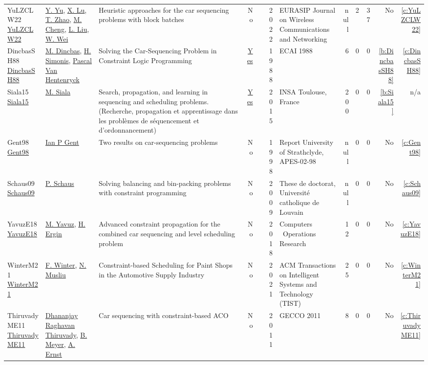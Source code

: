 {\begin{longtable}{>{\raggedright\arraybackslash}p{3cm}>{\raggedright\arraybackslash}p{6cm}>{\raggedright\arraybackslash}p{6.5cm}rrrp{2.5cm}rrrrr}
YuLZCLW22 \href{http://dx.doi.org/10.1186/s13638-022-02113-7}{YuLZCLW22} & \hyperref[auth:a55]{Y. Yu}, \hyperref[auth:a56]{X. Lu}, \hyperref[auth:a57]{T. Zhao}, \hyperref[auth:a58]{M. Cheng}, \hyperref[auth:a59]{L. Liu}, \hyperref[auth:a60]{W. Wei} & Heuristic approaches for the car sequencing problems with block batches & No & \cite{YuLZCLW22} & 2022 & EURASIP Journal on Wireless Communications and Networking & null & 2 & 37 & No & \ref{c:YuLZCLW22}\\
DincbasSH88 \href{}{DincbasSH88} & \hyperref[auth:a2]{M. Dincbas}, \hyperref[auth:a3]{H. Simonis}, \hyperref[auth:a4]{Pascal Van Hentenryck} & Solving the Car-Sequencing Problem in Constraint Logic Programming & \href{../cars/works/DincbasSH88.pdf}{Yes} & \cite{DincbasSH88} & 1988 & ECAI 1988 & 6 & 0 & 0 & \ref{b:DincbasSH88} & \ref{c:DincbasSH88}\\
Siala15 \href{https://tel.archives-ouvertes.fr/tel-01164291}{Siala15} & \hyperref[auth:a11]{M. Siala} & Search, propagation, and learning in sequencing and scheduling problems. (Recherche, propagation et apprentissage dans les probl{\`{e}}mes de s{\'{e}}quencement et d'ordonnancement) & \href{../cars/works/Siala15.pdf}{Yes} & \cite{Siala15} & 2015 & {INSA} Toulouse, France & 200 & 0 & 0 & \ref{b:Siala15} & n/a\\
Gent98 \href{}{Gent98} & \hyperref[auth:a18]{Ian P Gent} & Two results on car-sequencing problems & No & \cite{Gent98} & 1998 & Report University of Strathclyde, APES-02-98 & null & 0 & 0 & No & \ref{c:Gent98}\\
Schaus09 \href{}{Schaus09} & \hyperref[auth:a19]{P. Schaus} & Solving balancing and bin-packing problems with constraint programming & No & \cite{Schaus09} & 2009 & These de doctorat, Universit{\'e} catholique de Louvain & null & 0 & 0 & No & \ref{c:Schaus09}\\
YavuzE18 \href{}{YavuzE18} & \hyperref[auth:a22]{M. Yavuz}, \hyperref[auth:a23]{H. Ergin} & Advanced constraint propagation for the combined car sequencing and level scheduling problem & No & \cite{YavuzE18} & 2018 & Computers \  Operations Research & 12 & 0 & 0 & No & \ref{c:YavuzE18}\\
WinterM21 \href{}{WinterM21} & \hyperref[auth:a24]{F. Winter}, \hyperref[auth:a25]{N. Musliu} & Constraint-based Scheduling for Paint Shops in the Automotive Supply Industry & No & \cite{WinterM21} & 2021 & ACM Transactions on Intelligent Systems and Technology (TIST) & 25 & 0 & 0 & No & \ref{c:WinterM21}\\
ThiruvadyME11 \href{}{ThiruvadyME11} & \hyperref[auth:a26]{Dhananjay Raghavan Thiruvady}, \hyperref[auth:a27]{B. Meyer}, \hyperref[auth:a28]{A. Ernst} & Car sequencing with constraint-based ACO & No & \cite{ThiruvadyME11} & 2011 & GECCO 2011 & 8 & 0 & 0 & No & \ref{c:ThiruvadyME11}\\

\end{longtable}}
